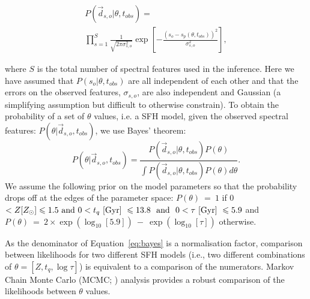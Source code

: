 \documentclass[useAMS,usenatbib]{mn2e}
\begin{document}
\begin{multline}\label{like}
P(\vec{d}_{s, o}|\theta, t_{obs}) = \\ \prod_{s=1}^{S} \frac{1}{\sqrt{2\pi\sigma_{s,o}^2}} \exp{\left[ - \frac{(s_{o} - s_{p}(\theta, t_{obs}))^2}{\sigma_{s, o}^2} \right]},
\end{multline}

where $S$ is the total number of spectral features used in the inference. Here we have assumed that $P(s_{o}|\theta, t_{obs})$ are all independent of each other and that the errors on the observed features, $\sigma_{s, o}$, are also independent and Gaussian (a simplifying assumption but difficult to otherwise constrain). To obtain the probability of a set of $\theta$ values, i.e. a SFH model, given the observed spectral features: $P(\theta|\vec{d}_{s,o}, t_{obs})$, we use Bayes' theorem:
 \begin{equation}\label{eq:bayes}
P(\theta|\vec{d}_{s,o}, t_{obs}) = \frac{P(\vec{d}_{s,o}|\theta, t_{obs})P(\theta)}{\int P(\vec{d}_{s,o} |\theta, t_{obs})P(\theta) d\theta}.
\end{equation}
We assume the following prior on the model parameters so that the probability drops off at the edges of the parameter space: ${P(\theta)~=~1}$ if 0 $< Z [Z_{\odot}] \leq 1.5 \text{ and } 0 < t_q ~\rm{[Gyr]}~ \leq 13.8 ~ \text{ and } ~ 0 < \tau  ~\rm{[Gyr]}~ \leq 5.9$ and ${P(\theta)~=~2\times\exp\left(\log_{10}[5.9]\right)~-~\exp\left(\log_{10}[\tau]\right)}$ otherwise.




As the denominator of Equation~\ref{eq:bayes} is a normalisation factor, comparison between likelihoods for two different SFH models (i.e., two different combinations of $\theta = [Z, t_q, \log \tau]$) is equivalent to a comparison of the numerators. Markov Chain Monte Carlo (MCMC; \citealt{mackay03, emcee13, GW10}) analysis provides a robust comparison of the likelihoods between $\theta$ values.
\end{document}
